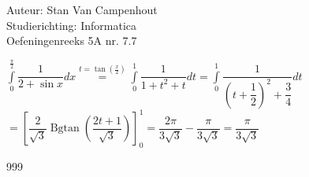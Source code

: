 \documentclass[a4paper]{article}
\begin{document}
  
\noindent \large Auteur: Stan Van Campenhout \\
\noindent \large Studierichting:  Informatica\\
\noindent \large Oefeningenreeks 5A nr. 7.7\\

\medskip

\normalsize

$ \displaystyle\int\limits_0^{\tfrac{\pi}{2}}\dfrac{1}{2+\sin x}dx \stackrel{t = \tan\left(\tfrac{x}{2}\right)}{=}  \displaystyle\int\limits_0^1\dfrac{1}{1+t^2+t}dt
= \displaystyle\int\limits_0^1\dfrac{1}{\left(t+\dfrac{1}{2}\right)^2+\dfrac{3}{4}}dt $\\

$ = \left[\dfrac{2}{\sqrt{3}}\operatorname{Bgtan}\left(\dfrac{2t+1}{\sqrt{3}}\right)\right]_0^1 = \dfrac{2\pi}{3\sqrt{3}} - \dfrac{\pi}{3\sqrt{3}} = \dfrac{\pi}{3\sqrt{3}} $\\

\begin{thebibliography}{999}
\end{thebibliography}
\end{document}
